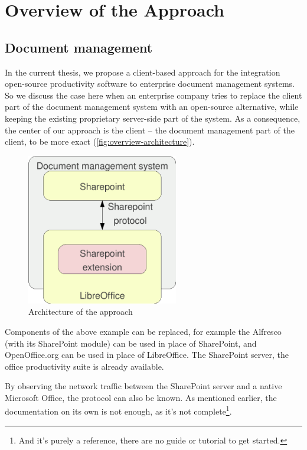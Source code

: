 \chapter{Overview of the Approach}

\section{Document management}

In the current thesis, we propose a client-based approach for the integration
open-source productivity software to enterprise document management systems. So
we discuss the case here when an enterprise company tries to replace the client
part of the document management system with an open-source alternative, while
keeping the existing proprietary server-side part of the system. As a
consequence, the center of our approach is the client -- the document management
part of the client, to be more exact (\autoref{fig:overview-architecture}).

\begin{figure}[H]
\centering
\includegraphics[width=250px,keepaspectratio]{overview-architecture.pdf}
\caption{Architecture of the approach}
\label{fig:overview-architecture}
\end{figure}

Components of the above example can be replaced, for example the Alfresco (with
its SharePoint module) can be used in place of SharePoint, and OpenOffice.org
can be used in place of LibreOffice. The SharePoint server, the office
productivity suite is already available.

By observing the network traffic between the SharePoint server and a native
Microsoft Office, the protocol can also be known. As mentioned earlier, the
documentation on its own is not enough, as it's not complete\footnote{And it's
purely a reference, there are no guide or tutorial to get started.}.

